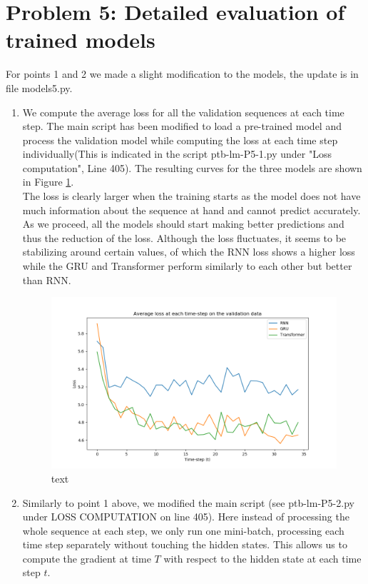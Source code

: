 \section{Problem 5: Detailed evaluation of trained models}
For points 1 and 2 we made a slight modification to the models, the update is in file models5.py.
\begin{enumerate}
	\item
We compute the average loss for all the validation sequences at each time step. The main script has been modified to load a pre-trained model and process the validation model while computing the loss at each time step individually(This is indicated in the script ptb-lm-P5-1.py under "Loss computation", Line 405). The resulting curves for the three models are shown in Figure \ref{fig:5_1}. \\
The loss is clearly larger when the training starts as the model does not have much information about the sequence at hand and cannot predict accurately. As we proceed, all the models should start making better predictions and thus the reduction of the loss. Although the loss fluctuates, it seems to be stabilizing around certain values, of which the RNN loss shows a higher loss while the GRU and Transformer perform similarly to each other but better than RNN. 
\begin{figure}
	\centering
	\includegraphics[width=15cm]{loss_t-step}
	\caption{text}
	\label{fig:5_1}
\end{figure}
\item
Similarly to point 1 above, we modified the main script (see ptb-lm-P5-2.py under LOSS COMPUTATION on line 405). Here instead of processing the whole sequence at each step, we only run one mini-batch, processing each time step separately without touching the hidden states. This allows us to compute the gradient at time $T$ with respect to the hidden state at each time step $t$. \\

\end{enumerate}
